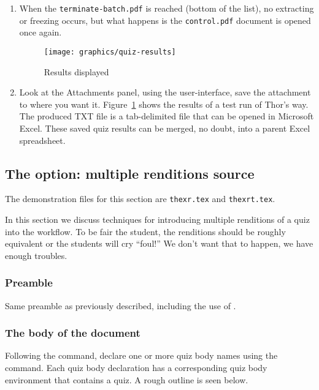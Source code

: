 \documentclass{article}
\let\tops\texorpdfstring
\begin{document}
\begin{enumerate}
\item When the \texttt{terminate-batch.pdf} is reached (bottom of the
    list), no extracting or freezing occurs, but what happens is the
    \texttt{control.pdf} document is opened once again.

\begin{figure}[tbh]\centering\setlength\fboxsep{0pt}
\texttt{[image: graphics/quiz-results]}\\
\caption{\textsf{Results displayed}}\label{cap:qr}
\end{figure}

\item Look at the \textsf{Attachments} panel, using the user-interface,
    save the attachment to where you want it. Figure~\ref{cap:qr} shows the
    results of a test run of \textsf{Thor's way}. The produced TXT file is
    a tab-delimited file that can be opened in \textsf{Microsoft Excel}.
    These saved quiz results can be merged, no doubt, into a parent
    \textsf{Excel} spreadsheet.

\end{enumerate}

\subsection{The \tops{\protect{}}{usebatch} option: multiple renditions source}\label{ss:mr}

The demonstration files for this section are \texttt{thexr.tex} and \texttt{thexrt.tex}.

\newtopic\noindent
In this section we discuss techniques for introducing multiple renditions of
a quiz into the workflow. To be fair the student, the renditions should be roughly equivalent or the students will cry
``foul!'' We don't want that to happen, we have enough troubles.

\subsubsection{Preamble}

Same preamble as previously described, including the use of .

\subsubsection{The body of the document}

Following the  command, declare one or more quiz body names using
the  command. Each quiz body declaration has a corresponding quiz
body environment that contains a quiz. A rough outline is seen below.
\end{document}
